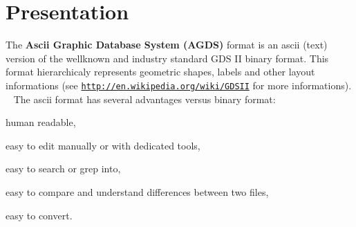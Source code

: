 \hypertarget{agds_agdsPres}{}\section{Presentation}\label{agds_agdsPres}
The {\bfseries Ascii Graphic Database System (A\+G\+DS)} format is an ascii (text) version of the wellknown and industry standard G\+DS II binary format. This format hierarchicaly represents geometric shapes, labels and other layout informations (see \href{http://en.wikipedia.org/wiki/GDSII}{\tt http\+://en.\+wikipedia.\+org/wiki/\+G\+D\+S\+II} for more informations). ~\newline
The ascii format has several advantages versus binary format\+:
\begin{DoxyItemize}
\item human readable,
\item easy to edit manually or with dedicated tools,
\item easy to search or grep into,
\item easy to compare and understand differences between two files,
\item easy to convert.
\end{DoxyItemize}

